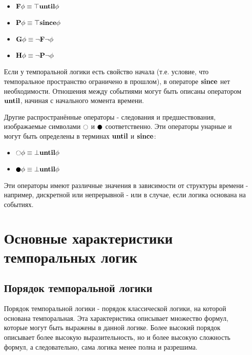  	\begin{itemize}
 		\item $ \textbf{F} \phi \equiv \top \text{\textbf{until}} \phi $
 		\item $ \textbf{P} \phi \equiv \top \text{\textbf{since}} \phi $
 		\item $ \textbf{G} \phi \equiv \neg \textbf{F} \neg \phi$
 		\item $ \textbf{H} \phi \equiv \neg \textbf{P} \neg \phi$
 	\end{itemize}
 	
 	Если у темпоральной логики есть свойство начала (т.е. условие, что темпоральное пространство ограничено в прошлом), в операторе $ \text{\textbf{since}} $ нет необходимости.
 	Отношения между событиями могут быть описаны оператором $ \text{\textbf{until}} $, начиная с начального момента времени.
 	
 	Другие распространённые операторы - следования и предшествования, изображаемые символами $ \Next $ и $ \Prev $ соответственно.
 	Эти операторы унарные и могут быть определены в терминах $ \text{\textbf{until}} $ и $ \text{\textbf{since}} $:
 	\begin{itemize}
 		\item $ \Next \phi \equiv \false \until \phi $
 		\item $ \Prev \phi \equiv \false \until \phi $
 	\end{itemize}
 	Эти операторы имеют различные значения в зависимости от структуры времени - например, дискретной или непрерывной - или в случае, если логика основана на событиях.
 	
 	
	\section{Основные характеристики темпоральных логик}
		\subsection{Порядок темпоральной логики}
		 Порядок темпоральной логики - порядок классической логики, на которой основана темпоральная.
		 Эта характеристика описывает множество формул, которые могут быть выражены в данной логике.
		 Более высокий порядок описывает более высокую выразительность, но и более высокую сложность формул, а следовательно, сама логика менее полна и разрешима.\cite{Bucci}
